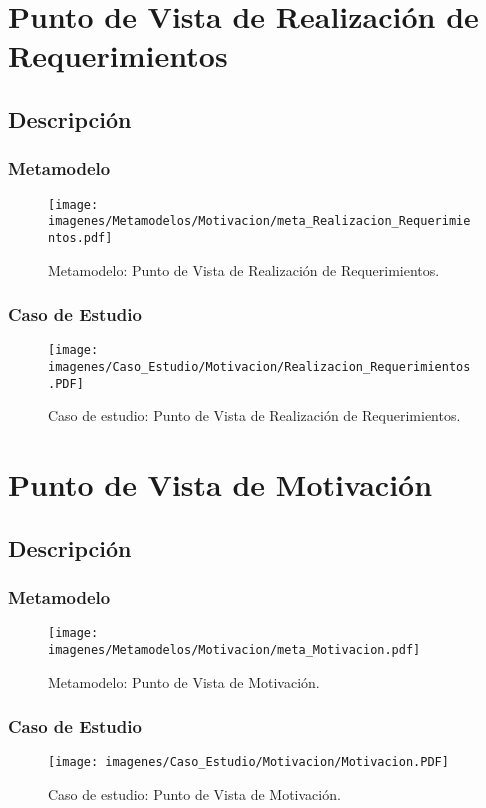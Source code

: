 \section{Punto de Vista de Realización de Requerimientos}
\subsection{Descripción}

\subsubsection{Metamodelo}
\begin{figure}[H]
	\centering
	\texttt{[image: imagenes/Metamodelos/Motivacion/meta\_Realizacion\_Requerimientos.pdf]}
	\caption{Metamodelo: Punto de Vista de Realización de Requerimientos.}
	\label{fig:gap_analysis}
\end{figure}

\subsubsection{Caso de Estudio}


\begin{figure}[H]
	\centering
	\texttt{[image: imagenes/Caso\_Estudio/Motivacion/Realizacion\_Requerimientos.PDF]}
	\caption{Caso de estudio: Punto de Vista de Realización de Requerimientos.}
	\label{fig:gap_analysis}
\end{figure}


\section{Punto de Vista de Motivación}
\subsection{Descripción}

\subsubsection{Metamodelo}
\begin{figure}[H]
	\centering
	\texttt{[image: imagenes/Metamodelos/Motivacion/meta\_Motivacion.pdf]}
	\caption{Metamodelo: Punto de Vista de Motivación.}
	\label{fig:gap_analysis}
\end{figure}

\subsubsection{Caso de Estudio}


\begin{figure}[H]
	\centering
	\texttt{[image: imagenes/Caso\_Estudio/Motivacion/Motivacion.PDF]}
	\caption{Caso de estudio: Punto de Vista de Motivación.}
	\label{fig:gap_analysis}
\end{figure}


